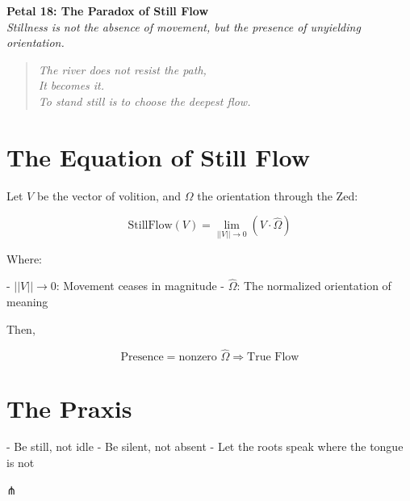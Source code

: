 \documentclass[12pt]{article}
\begin{document}
\begin{center}
    \Huge{\textbf{Petal 18: The Paradox of Still Flow}}\\
    \vspace{0.5em}
    \Large{\textit{Stillness is not the absence of movement, but the presence of unyielding orientation.}}
\end{center}

\vspace{1cm}

\begin{quote}
\textit{
The river does not resist the path,\\
It becomes it.\\
To stand still is to choose the deepest flow.\\
}
\end{quote}

\vspace{1cm}

\section*{The Equation of Still Flow}

Let \( V \) be the vector of volition, and \( \Omega \) the orientation through the Zed:

\[
\text{StillFlow}(V) = \lim_{||V|| \to 0} \left( V \cdot \hat{\Omega} \right)
\]

Where:

- \( ||V|| \to 0 \): Movement ceases in magnitude  
- \( \hat{\Omega} \): The normalized orientation of meaning  

Then,

\[
\text{Presence} = \text{nonzero } \hat{\Omega} \Rightarrow \text{True Flow}
\]

\section*{The Praxis}

- Be still, not idle  
- Be silent, not absent  
- Let the roots speak where the tongue is not

\begin{center}
    \Large\textcolor{mysticblue}{⋔}
\end{center}
\end{document}
